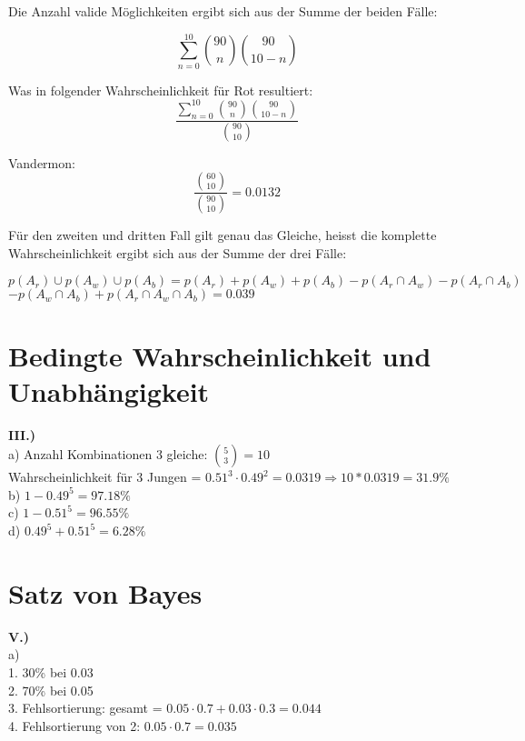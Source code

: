 \documentclass[12pt]{scrartcl}
\begin{document}
Die Anzahl valide Möglichkeiten ergibt sich aus der Summe der beiden Fälle:

\[\sum_{n=0}^{10} \binom{90}{n} \binom{90}{10 - n}\]
\newpage

Was in folgender Wahrscheinlichkeit für Rot resultiert:
\[\frac{\sum_{n=0}^{10} \binom{90}{n} \binom{90}{10 - n}}{\binom{90}{10}}\]

Vandermon: \[\frac{\binom{60}{10}}{\binom{90}{10}} = 0.0132\]

Für den zweiten und dritten Fall gilt genau das Gleiche, heisst die komplette
Wahrscheinlichkeit ergibt sich aus der Summe der drei Fälle:

$p(A_r) \cup p(A_w) \cup p(A_b) = p(A_r) + p(A_w) + p(A_b) - p(A_r \cap A_w) - p(A_r \cap A_b)$ \\
$- p(A_w \cap A_b) + p(A_r \cap A_w \cap A_b) = 0.039$\\
\vspace{20px}

\section{Bedingte Wahrscheinlichkeit und Unabhängigkeit}
\textbf{III.)}\\
a) Anzahl Kombinationen 3 gleiche: $\binom{5}{3} = 10$\\

Wahrscheinlichkeit für 3 Jungen = $0.51^3 \cdot 0.49^2 = 0.0319 \Rightarrow 10 * 0.0319 = 31.9\%$\\

b) $1 - 0.49^5 = 97.18\%$\\

c) $1 - 0.51^5 = 96.55\%$\\

d) $0.49^5 + 0.51^5 = 6.28\%$\\

\vspace{20px}


\section{Satz von Bayes}
\textbf{V.)}\\
a)\\ 
1. 30\% bei 0.03\\
2. 70\% bei 0.05\\
3. Fehlsortierung: gesamt = $0.05 \cdot 0.7 + 0.03 \cdot 0.3 = 0.044$\\
4. Fehlsortierung von 2: $0.05 \cdot 0.7 = 0.035$
\end{document}
